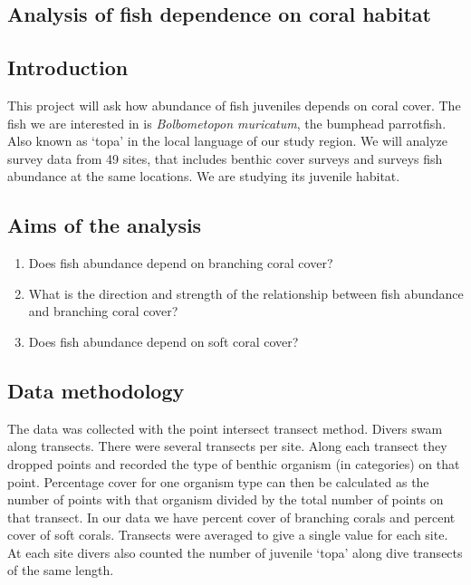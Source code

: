 \documentclass[
  letterpaper,
  DIV=11,
  numbers=noendperiod]{scrreprt}
\providecommand{\tightlist}{%
  \setlength{\itemsep}{0pt}\setlength{\parskip}{0pt}}
\begin{document}
\begin{tcolorbox}[enhanced jigsaw, bottomtitle=1mm, leftrule=.75mm, breakable, colbacktitle=quarto-callout-note-color!10!white, colframe=quarto-callout-note-color-frame, coltitle=black, toprule=.15mm, rightrule=.15mm, left=2mm, bottomrule=.15mm, title=\textcolor{quarto-callout-note-color}{\faInfo}\hspace{0.5em}{Prompt}, opacityback=0, arc=.35mm, toptitle=1mm, titlerule=0mm, opacitybacktitle=0.6, colback=white]

\chapter{Analysis of fish dependence on coral
habitat}\label{analysis-of-fish-dependence-on-coral-habitat}

\section{Introduction}\label{introduction-1}

This project will ask how abundance of fish juveniles depends on coral
cover. The fish we are interested in is \emph{Bolbometopon muricatum},
the bumphead parrotfish. Also known as `topa' in the local language of
our study region. We will analyze survey data from 49 sites, that
includes benthic cover surveys and surveys fish abundance at the same
locations. We are studying its juvenile habitat.

\section{Aims of the analysis}\label{aims-of-the-analysis}

\begin{enumerate}
\def\labelenumi{\arabic{enumi}.}
\tightlist
\item
  Does fish abundance depend on branching coral cover?
\item
  What is the direction and strength of the relationship between fish
  abundance and branching coral cover?
\item
  Does fish abundance depend on soft coral cover?
\end{enumerate}

\section{Data methodology}\label{data-methodology}

The data was collected with the point intersect transect method. Divers
swam along transects. There were several transects per site. Along each
transect they dropped points and recorded the type of benthic organism
(in categories) on that point. Percentage cover for one organism type
can then be calculated as the number of points with that organism
divided by the total number of points on that transect. In our data we
have percent cover of branching corals and percent cover of soft corals.
Transects were averaged to give a single value for each site. At each
site divers also counted the number of juvenile `topa' along dive
transects of the same length.


\end{tcolorbox}
\end{document}
